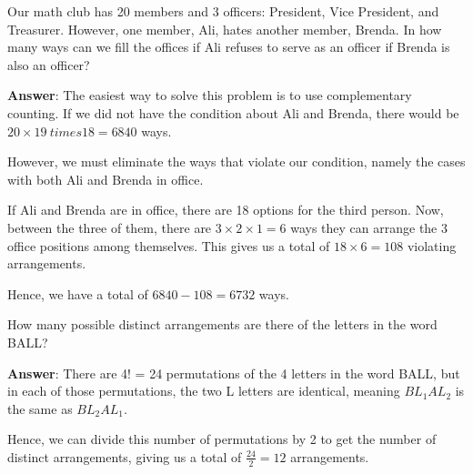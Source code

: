 \documentclass[12pt]{article}
\newenvironment{exercise}[2][Exercise]{\begin{trivlist}
\item[\hskip \labelsep {\bfseries #1}\hskip \labelsep {\bfseries #2.}]}{\end{trivlist}}
\begin{document}
\begin{exercise}{1.5}
Our math club has 20 members and 3 officers: President, Vice President, and Treasurer. However, one member, Ali, hates another member, Brenda. In how many ways can we fill the offices if Ali refuses to serve as an officer if Brenda is also an officer?

\textbf{Answer}: The easiest way to solve this problem is to use complementary counting. If we did not have the condition about Ali and Brenda, there would be $20 \times 19 \ times 18 = 6840$ ways. 

However, we must eliminate the ways that violate our condition, namely the cases with both Ali and Brenda in office. 

If Ali and Brenda are in office, there are 18 options for the third person. Now, between the three of them, there are $3 \times 2 \times 1 = 6$ ways they can arrange the 3 office positions among themselves. This gives us a total of $18 \times 6 = 108$ violating arrangements.

Hence, we have a total of $6840 - 108 = \boxed{6732}$ ways.

\end{exercise}

\begin{exercise}{1.6}
How many possible distinct arrangements are there of the letters in the word BALL?

\textbf{Answer}: There are 4! = 24 permutations of the 4 letters in the word BALL, but in each of those permutations, the two L letters are identical, meaning $BL_1AL_2$ is the same as $BL_2AL_1$. 

Hence, we can divide this number of permutations by 2 to get the number of distinct arrangements, giving us a total of $\frac{24}{2} = \boxed{12}$ arrangements.

\end{exercise}
\end{document}
